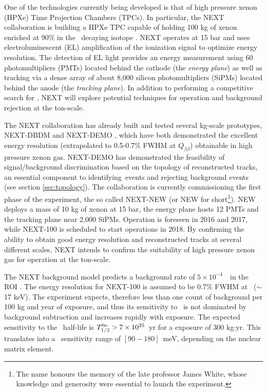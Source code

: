 \documentclass[a4paper,11pt]{article}
\begin{document}
One of the technologies currently being developed is that of high pressure xenon (HPXe) Time Projection Chambers (TPCs). In particular, the NEXT collaboration \cite{Gomez-Cadenas:2014dxa} is building a HPXe TPC capable of holding 100 kg of xenon enriched at 90\% in the \bb\ decaying isotope \XE. NEXT operates at 15 bar and uses electroluminescent (EL) amplification of the ionization signal to optimize energy resolution. The detection of EL light provides an energy measurement using 60 photomultipliers (PMTs) located behind the cathode (the \emph{energy plane}) as well as tracking  via a dense array of about 8,000 silicon photomultipliers (SiPMs) located behind the anode (the \emph{tracking plane}).
In addition to performing a competitive search for \bbonu, NEXT will explore potential 
techniques for operation and background rejection at the ton-scale.  

The NEXT collaboration has already built and tested several kg-scale prototypes, NEXT-DBDM \cite{Alvarez:2012kua} and
NEXT-DEMO \cite{Alvarez:2012xda,Alvarez:2012kua,Alvarez:2013gxa,Lorca:2014sra}, which have both demonstrated the excellent energy resolution (extrapolated to 0.5-0.7\% FWHM at
$Q_{\beta\beta}$) obtainable in high pressure xenon gas.  NEXT-DEMO has demonstrated the feasibility of signal/background discrimination based on the topology of reconstructed tracks,
an essential component to identifying \bbonu\,events and rejecting background events (see section \ref{sec:topology}).  The collaboration is currently commissioning the first phase of the experiment, the so called NEXT-NEW (or NEW for short\footnote{The name honours the memory of the late professor James White, whose knowledge and generosity were essential to launch the experiment.}). NEW deploys a  mass of 10 kg of xenon at 15 bar, the energy plane hosts 12 PMTs and the tracking plane near 2,000 SiPMs. Operation is foreseen in 2016 and 2017, while NEXT-100 is scheduled to start operations in 2018.  By confirming the ability to obtain good energy resolution and reconstructed tracks at several different scales, NEXT 
intends to confirm the suitability of high pressure xenon gas for operation at the ton-scale.


The NEXT background model predicts a background rate of $5 \times 10^{-4}$~\ckky\ in the ROI  \cite{Martin-Albo:2015rhw}. The energy resolution for NEXT-100 is assumed to be 0.7\% FWHM at \Qbb\ ($\sim$ 17 keV).  The experiment expects, therefore less than one count of background per 100 kg and year of exposure, and thus its sensitivity to \Tonu\ is not dominated by background subtraction and increases rapidly with exposure. The expected sensitivity to the \bbonu\ half-life is $T_{1/2}^{0\nu} > 7 \times 10^{25}$~yr for a exposure of 300 kg$\cdot$yr. This translates into a \mbb\ sensitivity range of $[90-180]$~meV, depending on the nuclear matrix element.
\end{document}
